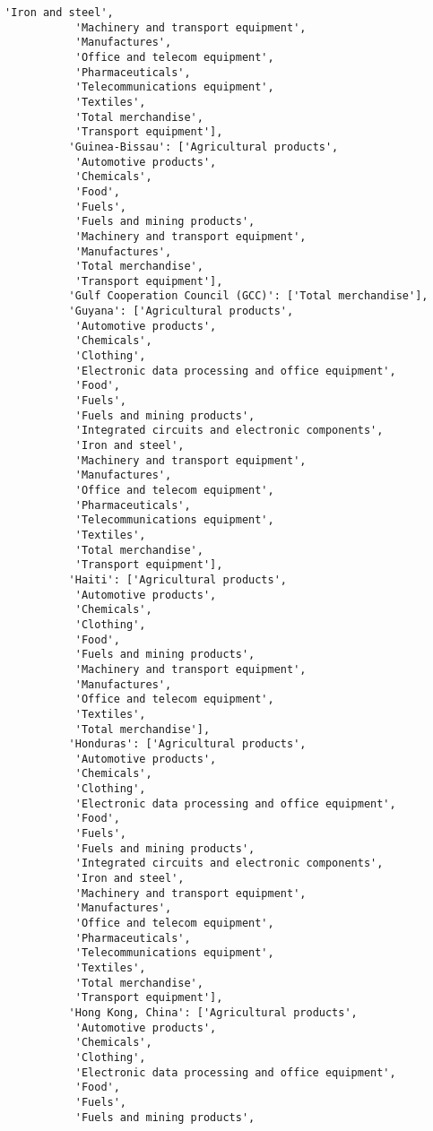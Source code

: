 \documentclass[11pt]{article}
\begin{document}
\begin{Verbatim}[commandchars=\\\{\}]
           'Iron and steel',
           'Machinery and transport equipment',
           'Manufactures',
           'Office and telecom equipment',
           'Pharmaceuticals',
           'Telecommunications equipment',
           'Textiles',
           'Total merchandise',
           'Transport equipment'],
          'Guinea-Bissau': ['Agricultural products',
           'Automotive products',
           'Chemicals',
           'Food',
           'Fuels',
           'Fuels and mining products',
           'Machinery and transport equipment',
           'Manufactures',
           'Total merchandise',
           'Transport equipment'],
          'Gulf Cooperation Council (GCC)': ['Total merchandise'],
          'Guyana': ['Agricultural products',
           'Automotive products',
           'Chemicals',
           'Clothing',
           'Electronic data processing and office equipment',
           'Food',
           'Fuels',
           'Fuels and mining products',
           'Integrated circuits and electronic components',
           'Iron and steel',
           'Machinery and transport equipment',
           'Manufactures',
           'Office and telecom equipment',
           'Pharmaceuticals',
           'Telecommunications equipment',
           'Textiles',
           'Total merchandise',
           'Transport equipment'],
          'Haiti': ['Agricultural products',
           'Automotive products',
           'Chemicals',
           'Clothing',
           'Food',
           'Fuels and mining products',
           'Machinery and transport equipment',
           'Manufactures',
           'Office and telecom equipment',
           'Textiles',
           'Total merchandise'],
          'Honduras': ['Agricultural products',
           'Automotive products',
           'Chemicals',
           'Clothing',
           'Electronic data processing and office equipment',
           'Food',
           'Fuels',
           'Fuels and mining products',
           'Integrated circuits and electronic components',
           'Iron and steel',
           'Machinery and transport equipment',
           'Manufactures',
           'Office and telecom equipment',
           'Pharmaceuticals',
           'Telecommunications equipment',
           'Textiles',
           'Total merchandise',
           'Transport equipment'],
          'Hong Kong, China': ['Agricultural products',
           'Automotive products',
           'Chemicals',
           'Clothing',
           'Electronic data processing and office equipment',
           'Food',
           'Fuels',
           'Fuels and mining products',

\end{Verbatim}
\end{document}
